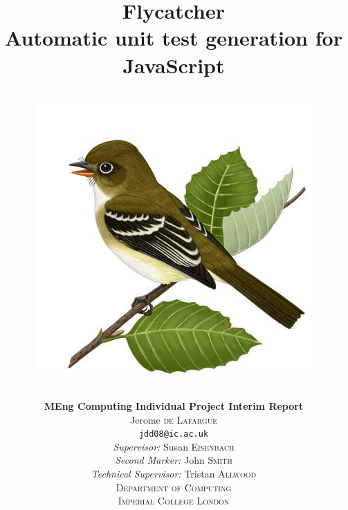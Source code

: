 \documentclass[a4paper,11pt,titlepage]{report}
\begin{document}
	
	\title
	{
		{\Huge \textbf{Flycatcher} \\[0.2cm]}
		{Automatic unit test generation for JavaScript\\[0.5cm]}
		\begin{figure}[h]
			\centering
			\includegraphics[scale=0.4]{flycatcher.jpg}
		\end{figure}
	}
	\author
	{	\vspace{1cm}
		{\textbf{MEng Computing Individual Project Interim Report}}\\[0.3cm]
		{\large Jerome \textsc{de Lafargue}}	\\
		\texttt{\scriptsize jdd08@ic.ac.uk}\\[3cm]
		\emph{\small Supervisor:}
		{\small Susan \textsc{Eisenbach}}\\
		\emph{\small Second Marker:}
		{\small John \textsc{Smith}}\\
		\emph{\small Technical Supervisor:}
		{\small Tristan \textsc{Allwood}}\\[3cm]
		\textsc{\scriptsize Department of Computing}\\
		\textsc{\small Imperial College London}
	}

	
	\date{}
	\maketitle
\end{document}
